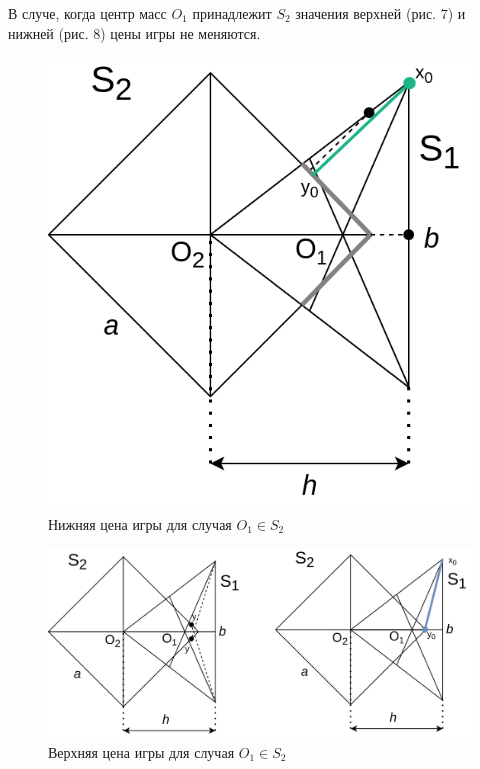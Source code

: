\documentclass[12pt,a4paper]{article}
\begin{document}
\vspace{.5cm}
В случе, когда центр масс $O_1$ принадлежит $S_2$ значения верхней (рис. 7)
и нижней (рис. 8) цены игры не меняются.

\begin{figure}[ht]
  \centering
  \includegraphics[scale=0.28]{persuit_min_max_2.drawio.png}
  \caption{Нижняя цена игры для случая $O_1 \in S_2$}
\end{figure}

\begin{figure}[ht]
  \centering
  \includegraphics[scale=0.28]{persuit_max_min_2.drawio.png}
  \caption{Верхняя цена игры для случая $O_1 \in S_2$}
\end{figure}
\end{document}

